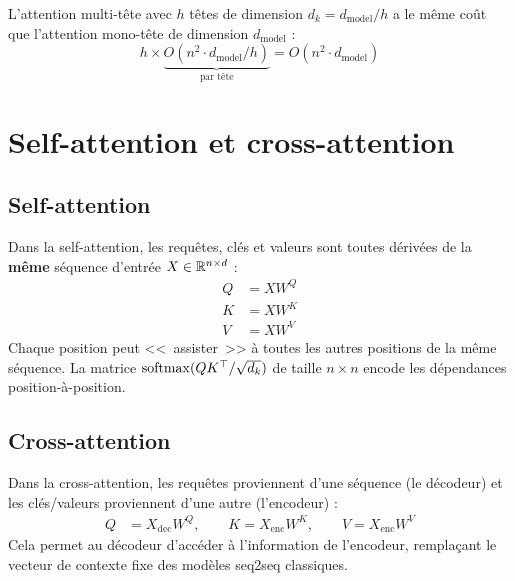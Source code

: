 \begin{remarque}[Co\^ut computationnel]
L'attention multi-t\^ete avec $h$ t\^etes de dimension $d_k = d_{\text{model}}/h$
a le m\^eme co\^ut que l'attention mono-t\^ete de dimension $d_{\text{model}}$ :
\begin{equation}
h \times \underbrace{O(n^2 \cdot d_{\text{model}}/h)}_{\text{par t\^ete}}
= O(n^2 \cdot d_{\text{model}})
\end{equation}
\end{remarque}

\section{Self-attention et cross-attention}
\label{sec:self-cross-attention}

\subsection{Self-attention}

\begin{definition}
Dans la self-attention, les requ\^etes, cl\'es et valeurs sont toutes
d\'eriv\'ees de la \textbf{m\^eme} s\'equence d'entr\'ee $X \in \mathbb{R}^{n \times d}$ :
\begin{align}
Q &= X W^Q \label{eq:self-q} \\
K &= X W^K \label{eq:self-k} \\
V &= X W^V \label{eq:self-v}
\end{align}
Chaque position peut <<~assister~>> \`a toutes les autres positions de la
m\^eme s\'equence. La matrice $\mathrm{softmax}(QK^\top / \sqrt{d_k})$ de taille
$n \times n$ encode les d\'ependances position-\`a-position.
\end{definition}

\subsection{Cross-attention}

\begin{definition}
Dans la cross-attention, les requ\^etes proviennent d'une s\'equence (le
d\'ecodeur) et les cl\'es/valeurs proviennent d'une autre (l'encodeur) :
\begin{align}
Q &= X_{\text{dec}} W^Q, \qquad
K = X_{\text{enc}} W^K, \qquad
V = X_{\text{enc}} W^V
\end{align}
Cela permet au d\'ecodeur d'acc\'eder \`a l'information de l'encodeur,
rempla\c{c}ant le vecteur de contexte fixe des mod\`eles seq2seq classiques.
\end{definition}

